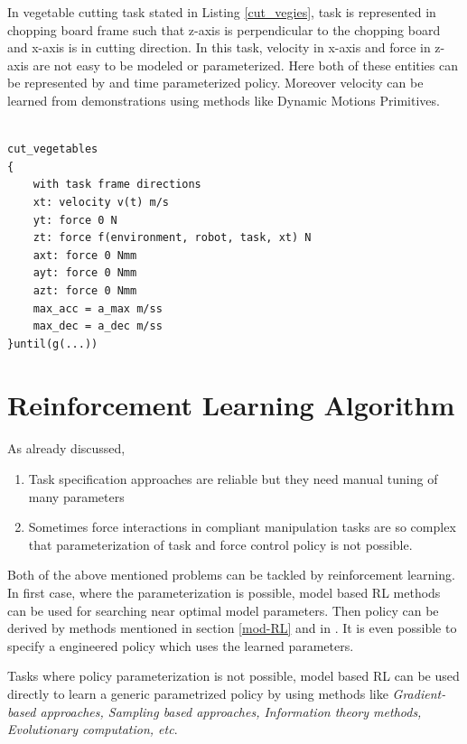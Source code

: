 \documentclass[thesis]{mas_proposal}
\begin{document}
In vegetable cutting task stated in Listing \ref{cut_vegies}, task is represented in chopping board frame such that z-axis is perpendicular to the chopping board and x-axis is in cutting direction. In this task, velocity in x-axis and force in z-axis are not easy to be modeled or parameterized. Here both of these entities can be represented by and time parameterized policy. Moreover velocity can be learned from demonstrations using methods like Dynamic Motions Primitives\cite{lioutikov2016learning}. 

\newpage
\begin{lstlisting}[label=cut_vegies,caption=Task specification for cutting vegetables]

cut_vegetables
{
	with task frame directions
	xt: velocity v(t) m/s
	yt: force 0 N
	zt: force f(environment, robot, task, xt) N
	axt: force 0 Nmm
	ayt: force 0 Nmm
	azt: force 0 Nmm
	max_acc = a_max m/ss
	max_dec = a_dec m/ss
}until(g(...))

\end{lstlisting}



\section{Reinforcement Learning Algorithm}

As already discussed, \begin{enumerate}
	\item Task specification approaches are reliable but they need manual tuning of many parameters
	\item Sometimes force interactions in compliant manipulation tasks are so complex that parameterization of task and force control policy is not possible. 
\end{enumerate}
Both of the above mentioned problems can be tackled by reinforcement learning. In first case, where the parameterization is possible, model based RL methods can be used for searching near optimal model parameters. Then policy can be derived by methods mentioned in section \ref{mod-RL} and in \cite{polydoros2017survey}. It is even possible to specify a engineered policy which uses the learned parameters.

Tasks where policy parameterization is not possible, model based RL can be used directly to learn a generic parametrized policy by using methods like \textit{Gradient-based approaches, Sampling based approaches, Information theory methods, Evolutionary computation, etc}\cite{polydoros2017survey}. 
\end{document}
